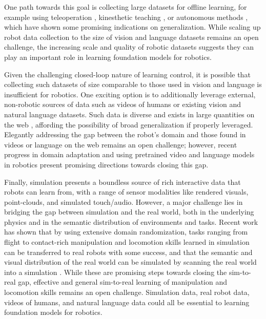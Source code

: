One path towards this goal is collecting large datasets for offline learning, for example using teleoperation \citep{mandelkar2019scaling}, kinesthetic teaching \citep{sharma2018mime}, or autonomous methods \citep{pinto2016supersizing, Gupta2018RobotLI, Levine2018LearningHC, dasari2019robonet, kalashnikov2021mt}, which have shown some promising indications on generalization. While scaling up robot data collection to the size of vision and language datasets  \citep{deng2009imagenet, krishna2017visual, raffel2019exploring, gao2020pile} remains an open challenge, the increasing scale and quality of robotic datasets suggests they can play an important role in learning foundation models for robotics. 

Given the challenging closed-loop nature of learning control, it is possible that collecting such datasets of size comparable to those used in vision and language is insufficient for robotics. One exciting option is to additionally leverage external, non-robotic sources of data such as videos of humans or existing vision and natural language datasets. Such data is diverse and exists in large quantities on the web \citep{deng2009imagenet,Lee2012DiscoveringIP, caba2015activitynet, Goyal2017TheS, damen2018kitchens, gao2020pile}, affording the possibility of broad generalization if properly leveraged. Elegantly addressing the gap between the robot’s domain and those found in videos or language on the web remains an open challenge; however, recent progress in domain adaptation \citep{Smith2019AVIDLM, Schmeckpeper2020ReinforcementLW} and using pretrained video and language models in robotics \citep{lynch2020grounding, shao2020concept2robot, chen2021generalizable} present promising directions towards closing this gap.

Finally, simulation presents a boundless source of rich interactive data that robots can learn from, with a range of sensor modalities like rendered visuals, point-clouds, and simulated touch/audio. However, a major challenge lies in bridging the gap between simulation and the real world, both in the underlying physics and in the semantic distribution of environments and tasks. Recent work has shown that by using extensive domain randomization, tasks ranging from flight \citep{Sadeghi2017CAD2RLRS} to contact-rich manipulation \citep{Mahler2017DexNet2D, OpenAI2019SolvingRC} and locomotion \citep{RoboImitationPeng20, hwangbo2019learning} skills learned in simulation can be transferred to real robots with some success, and that the semantic and visual distribution of the real world can be simulated by scanning the real world into a simulation \citep{Matterport3D, Kolve2017AI2THORAI, embodied, szot2021habitat, shen2021igibson}. While these are promising steps towards closing the sim-to-real gap, effective and general sim-to-real learning of manipulation and locomotion skills remains an open challenge. Simulation data, real robot data, videos of humans, and natural language data could all be essential to learning foundation models for robotics.


